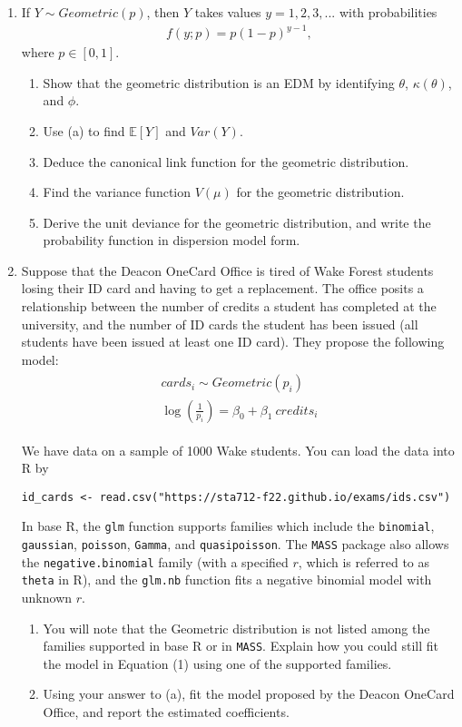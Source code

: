 \documentclass[11pt]{article}
\begin{document}
\begin{enumerate}
\item If $Y \sim Geometric(p)$, then $Y$ takes values $y = 1, 2, 3,...$ with probabilities
\begin{align*}
f(y;p) = p(1 - p)^{y-1},
\end{align*}
where $p \in [0, 1]$.
\begin{enumerate}
\item Show that the geometric distribution is an EDM by identifying $\theta$, $\kappa(\theta)$, and $\phi$.
\item Use (a) to find $\mathbb{E}[Y]$ and $Var(Y)$.
\item Deduce the canonical link function for the geometric distribution.
\item Find the variance function $V(\mu)$ for the geometric distribution.
\item Derive the unit deviance for the geometric distribution, and write the probability function in dispersion model form.
\end{enumerate}

\item Suppose that the Deacon OneCard Office is tired of Wake Forest students losing their ID card and having to get a replacement. The office posits a relationship between the number of credits a student has completed at the university, and the number of ID cards the student has been issued (all students have been issued at least one ID card). They propose the following model:
\begin{align}
\begin{split}
cards_i \sim Geometric(p_i) \\
\log \left( \frac{1}{p_i} \right) = \beta_0 + \beta_1 \ credits_i
\end{split}
\end{align}

\noindent We have data on a sample of 1000 Wake students. You can load the data into R by
\begin{verbatim}
id_cards <- read.csv("https://sta712-f22.github.io/exams/ids.csv")
\end{verbatim}

In base R, the \verb;glm; function supports families which include the \verb;binomial;, \verb;gaussian;, \verb;poisson;, \verb;Gamma;, and \verb;quasipoisson;. The \verb;MASS; package also allows the \verb;negative.binomial; family (with a specified $r$, which is referred to as \verb;theta; in R), and the \verb;glm.nb; function fits a negative binomial model with unknown $r$.

\begin{enumerate}
\item You will note that the Geometric distribution is not listed among the families supported in base R or in \verb;MASS;. Explain how you could still fit the model in Equation (1) using one of the supported families.

\item Using your answer to (a), fit the model proposed by the Deacon OneCard Office, and report the estimated coefficients.
\end{enumerate}
\end{enumerate}
\end{document}
